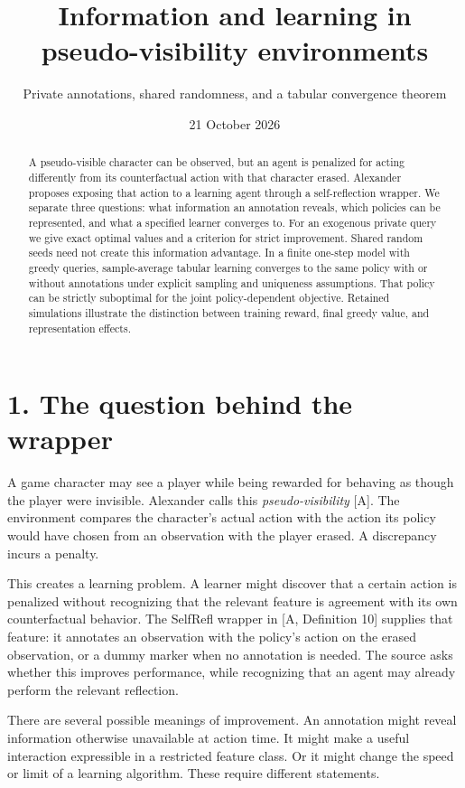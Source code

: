 \documentclass[
  11pt,
  letterpaper,
]{article}
\title{Information and learning in pseudo-visibility environments}
\subtitle{Private annotations, shared randomness, and a tabular
convergence theorem}
\author{}
\date{21 October 2026}
\begin{document}
\maketitle
\begin{abstract}
A pseudo-visible character can be observed, but an agent is penalized
for acting differently from its counterfactual action with that
character erased. Alexander proposes exposing that action to a learning
agent through a self-reflection wrapper. We separate three questions:
what information an annotation reveals, which policies can be
represented, and what a specified learner converges to. For an exogenous
private query we give exact optimal values and a criterion for strict
improvement. Shared random seeds need not create this information
advantage. In a finite one-step model with greedy queries,
sample-average tabular learning converges to the same policy with or
without annotations under explicit sampling and uniqueness assumptions.
That policy can be strictly suboptimal for the joint policy-dependent
objective. Retained simulations illustrate the distinction between
training reward, final greedy value, and representation effects.
\end{abstract}

\section{1. The question behind the
wrapper}\label{the-question-behind-the-wrapper}

A game character may see a player while being rewarded for behaving as
though the player were invisible. Alexander calls this
\emph{pseudo-visibility} {[}A{]}. The environment compares the
character's actual action with the action its policy would have chosen
from an observation with the player erased. A discrepancy incurs a
penalty.

This creates a learning problem. A learner might discover that a certain
action is penalized without recognizing that the relevant feature is
agreement with its own counterfactual behavior. The SelfRefl wrapper in
{[}A, Definition 10{]} supplies that feature: it annotates an
observation with the policy's action on the erased observation, or a
dummy marker when no annotation is needed. The source asks whether this
improves performance, while recognizing that an agent may already
perform the relevant reflection.

There are several possible meanings of improvement. An annotation might
reveal information otherwise unavailable at action time. It might make a
useful interaction expressible in a restricted feature class. Or it
might change the speed or limit of a learning algorithm. These require
different statements.
\end{document}

